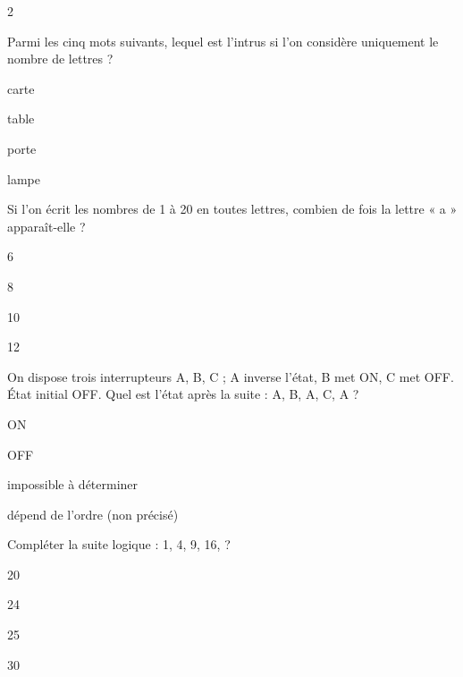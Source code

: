 

\newcommand{\titrechapitre}{Sujet type Sésame}
\newcommand{\numerochapitre}{1}

\renewcommand{\headrulewidth}{0.4pt}
\renewcommand{\footrulewidth}{0.4pt}
\fancyfoot[C]{\thepage}
\fancyhead[R]{\titrechapitre}




\begin{multicols}{2}
\begin{question}{}{}
Parmi les cinq mots suivants, lequel est l’intrus si l’on considère uniquement le nombre de lettres ?
\begin{enumeratebf}
\item carte
\item table
\item porte
\item lampe
\end{enumeratebf}
\end{question}

\begin{question}{}{}
Si l’on écrit les nombres de 1 à 20 en toutes lettres, combien de fois la lettre « a » apparaît-elle ?
\begin{enumeratebf}
\item 6
\item 8
\item 10
\item 12
\end{enumeratebf}
\end{question}

\begin{question}{}{}
On dispose trois interrupteurs A, B, C ; A inverse l’état, B met ON, C met OFF. État initial OFF. Quel est l’état après la suite : A, B, A, C, A ?
\begin{enumeratebf}
\item ON
\item OFF
\item impossible à déterminer
\item dépend de l’ordre (non précisé)
\end{enumeratebf}
\end{question}

\begin{question}{}{}
Compléter la suite logique : 1, 4, 9, 16, ?
\begin{enumeratebf}
\item 20
\item 24
\item 25
\item 30
\end{enumeratebf}
\end{question}


\end{multicols}
